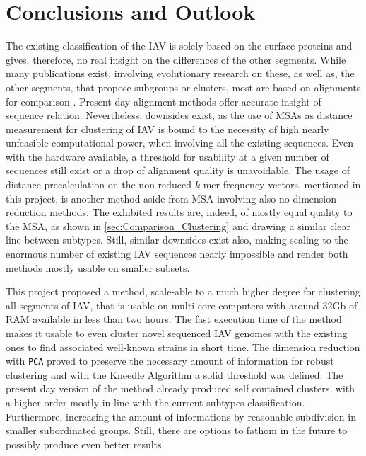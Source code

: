\chapter{Conclusions and Outlook} \label{chap:Conclusion}

The existing classification of the \gls{IAV} is solely based on the surface proteins and gives, therefore, no real insight on the differences of the other segments. While many publications exist, involving evolutionary research on these, as well as, the other segments, that propose subgroups or clusters, most are based on alignments for comparison \autocite{suarez_evolution_2000, nelson_multiple_2008, whooiefao_h5n1_evolution_working_group_continued_2012}. Present day alignment methods offer accurate insight of sequence relation. Nevertheless, downsides exist, as the use of \glspl{MSA} as distance measurement for clustering of \gls{IAV} is bound to the necessity of high nearly unfeasible computational power, when involving all the existing sequences. Even with the hardware available, a threshold for usability at a given number of sequences still exist or a drop of alignment quality is unavoidable. The usage of distance precalculation on the non-reduced $k$-mer frequency vectors, mentioned in this project, is another method aside from \gls{MSA} involving also no dimension reduction methods. The exhibited results are, indeed, of mostly equal quality to the \gls{MSA}, as shown in \autoref{sec:Comparison_Clustering} and drawing a similar clear line between subtypes. Still, similar downsides exist also, making scaling to the enormous number of existing \gls{IAV} sequences nearly impossible and render both methods mostly usable on smaller subsets.

\vspace{1em}

This project proposed a method, scale-able to a much higher degree for clustering all segments of \gls{IAV}, that is usable on multi-core computers with around 32Gb of RAM available in less than two hours. The fast execution time of the method makes it usable to even cluster novel sequenced \gls{IAV} genomes with the existing ones to find associated well-known strains in short time. The dimension reduction with \texttt{PCA} proved to preserve the necessary amount of information for robust clustering and with the Kneedle Algorithm a solid threshold was defined. The present day version of the method already produced self contained clusters, with a higher order mostly in line with the current subtypes classification. Furthermore, increasing the amount of informations by reasonable subdivision in smaller subordinated groups. Still, there are options to fathom in the future to possibly produce even better results. 

